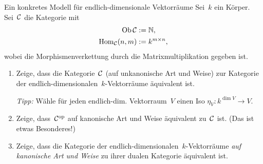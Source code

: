 \documentclass{uebblatt}
\begin{document}

\begin{aufgabe}{Ein konkretes Modell für endlich-dimensionale Vektorräume}
Sei~$k$ ein Körper. Sei~$\mathcal{C}$ die Kategorie mit
\begin{align*}
  \operatorname{Ob} \mathcal{C} &:= \mathbb{N}, \\
  \mathrm{Hom}_{\mathcal{C}}(n, m) &:= k^{m \times n},
\end{align*}
wobei die Morphismenverkettung durch die Matrixmultiplikation gegeben ist.
\begin{enumerate}
\item Zeige, dass die Kategorie~$\mathcal{C}$ (auf unkanonische Art und Weise) zur Kategorie der
endlich-dimensionalen~$k$-Vektorräume äquivalent ist.

\emph{Tipp:} Wähle für jeden endlich-dim. Vektorraum~$V$ einen Iso
$\eta_V : k^{\dim V} \to V$.
\item Zeige, dass~$\mathcal{C}^{\mathrm{op}}$ auf kanonische Art und Weise äquivalent zu~$\mathcal{C}$ ist. (Das ist etwas
Besonderes!)
\item Zeige, dass die Kategorie der endlich-dimensionalen~$k$-Vektorräume
\emph{auf kanonische Art und Weise} zu ihrer dualen Kategorie äquivalent ist.
\end{enumerate}
\end{aufgabe}
\end{document}

